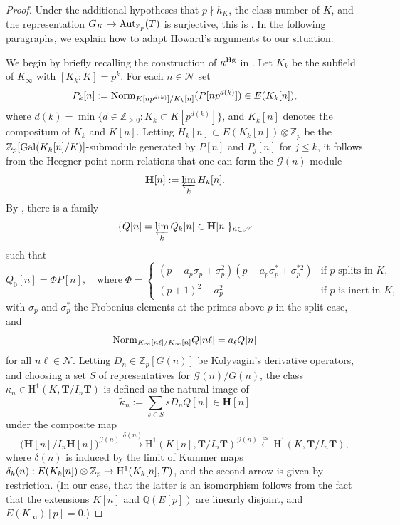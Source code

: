 \documentclass[10pt]{amsart}
\numberwithin{equation}{section}
\theoremstyle{definition}
\theoremstyle{remark}
\newcommand{\Z}{\mathbb{Z}}
\newcommand{\cN}{\mathscr{N}}
\newcommand{\bZ}{\mathbb{Z}}
\newcommand{\Q}{\mathbb{Q}}
\newcommand{\rH}{\mathrm{H}}
\begin{document}
\begin{proof} 
Under the additional hypotheses that $p\nmid h_K$, the class number of $K$, and the representation $G_K\rightarrow{\rm Aut}_{\Z_p}(T)$ is surjective, this is \cite[Thm.~2.3.1]{howard}. In the following paragraphs, we explain how to adapt Howard's arguments to our situation. 

We begin by briefly recalling the construction of $\kappa^{\rm Hg}$ in \cite[\S{2.3}]{howard}. Let $K_k$ be the subfield of $K_\infty$ with $[K_k\colon K]=p^k$. For each $n\in\cN$ set
\[
P_k[n]:={\rm Norm}_{K[np^{d(k)}]/K_k[n]}(P[np^{d(k)}])\in E(K_k[n]),
\]
where $d(k)=\min\{d\in\Z_{\geqslant 0}\colon K_k\subset K[p^{d(k)}]\}$, and $K_k[n]$ denotes the compositum of $K_k$ and $K[n]$. Letting $H_k[n]\subset E(K_k[n])\otimes\Z_p$ be the $\Z_p[{\rm Gal}(K_k[n]/K)]$-submodule generated by $P[n]$ and $P_j[n]$ for $j\leqslant k$, it follows from the Heegner point norm relations \cite[\S{3.1}]{perrinriou} that one can form the $\mathcal{G}(n)$-module
\[
\mathbf{H}[n]:=\varprojlim_k H_k[n].
\]
By \cite[Lem.~2.3.3]{howard}, there is a family 
\[
\{Q[n]=\varprojlim_k Q_k[n]\in\mathbf{H}[n]\}_{n\in\cN}
\]
such that
\begin{equation}\label{eq:multiplier}
Q_0[n]=\Phi P[n],\quad\textrm{where}\;
\Phi=
\left\{
\begin{array}{ll}
(p-a_p\sigma_p+\sigma_p^2)(p-a_p\sigma_p^*+\sigma_p^{*2}) & \textrm{if $p$ splits in $K$,}\\[0.2em]
(p+1)^2-a_p^2 & \textrm{if $p$ is inert in $K$,}
\end{array}
\right.
\end{equation}
with $\sigma_p$ and $\sigma_p^*$ the Frobenius elements at the primes above $p$ in the split case, and 
\[
{\rm Norm}_{K_{\infty}[n\ell]/K_{\infty}[n]}Q[n\ell] = a_{\ell}Q[n] 
\]
for all $n\ell\in\cN$. Letting $D_n\in\Z_p[G(n)]$ be Kolyvagin's derivative operators, and choosing a set $S$ of representatives for $\mathcal{G}(n)/G(n)$, the class $\kappa_n\in \rH^1(K,\mathbf{T}/I_n\mathbf{T})$ is defined as the natural image of 
\begin{equation}\label{eq:Qn}
\tilde{\kappa}_n:=\sum_{s\in S}sD_nQ[n]\in\mathbf{H}[n]
\end{equation}
under the composite map
\[
\bigl(\mathbf{H}[n]/I_n\mathbf{H}[n]\bigr)^{\mathcal{G}(n)}\xrightarrow{\delta(n)}\rH^1(K[n],\mathbf{T}/I_n\mathbf{T})^{\mathcal{G}(n)}\overset{\simeq}\longleftarrow\rH^1(K,\mathbf{T}/I_n\mathbf{T}),
\]
where $\delta(n)$ is induced by the limit of Kummer maps $\delta_k(n):E(K_k[n])\otimes\bZ_p\rightarrow{\rm H}^1(K_k[n],T)$, and the second arrow is given by restriction. (In our case, that the latter is an isomorphism follows from the fact that the extensions $K[n]$ and $\Q(E[p])$ are linearly disjoint, and $E(K_\infty)[p]=0$.) 


\end{proof}
\end{document}
